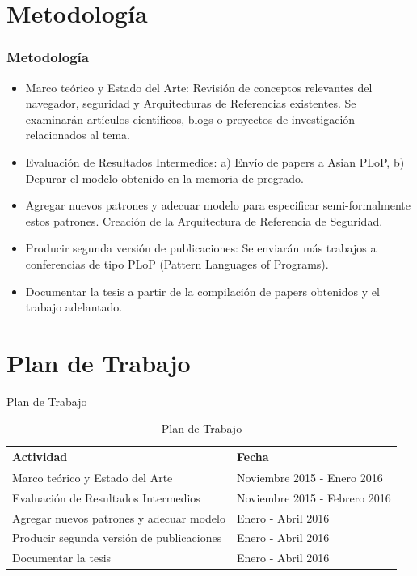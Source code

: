 \documentclass[serif,9pt]{beamer}
\begin{document}
\section{Metodología}
\begin{frame}
	\frametitle{Metodología}
	\begin{itemize}
		\item Marco teórico y Estado del Arte: Revisión de conceptos relevantes del navegador, seguridad y Arquitecturas de Referencias existentes. Se examinarán artículos científicos, blogs o proyectos de investigación relacionados al tema.
		\item Evaluación de Resultados Intermedios: a) Envío de papers a Asian PLoP, b) Depurar el modelo obtenido en la memoria de pregrado.
		\item Agregar nuevos patrones y adecuar modelo para especificar semi-formalmente estos patrones. Creación de la Arquitectura de Referencia de Seguridad.
		\item Producir segunda versión de publicaciones: Se enviarán más trabajos a conferencias de tipo PLoP (Pattern Languages of Programs).
		\item Documentar la tesis a partir de la compilación de papers obtenidos y el trabajo adelantado.
	\end{itemize}
\end{frame}

\section{Plan de Trabajo}
\begin{frame}
	\begin{table}{Plan de Trabajo}
        \begin{tabular}{ m{12em}|m{25em}} 
        \hline        
        \textbf{Actividad} & \textbf{Fecha}\\
        \hline
        Marco teórico y Estado del Arte & Noviembre 2015 - Enero 2016\\
        \hline
        Evaluación de Resultados Intermedios & Noviembre 2015  - Febrero 2016\\
        \hline
        Agregar nuevos patrones y adecuar modelo & Enero - Abril 2016\\
        \hline
        Producir segunda versión de publicaciones & Enero - Abril 2016\\
        \hline
        Documentar la tesis & Enero - Abril 2016\\        
        \hline
        \end{tabular}
        \caption{Plan de Trabajo}
        \label{tab:trabajo}
    \end{table}
\end{frame}
\end{document}
